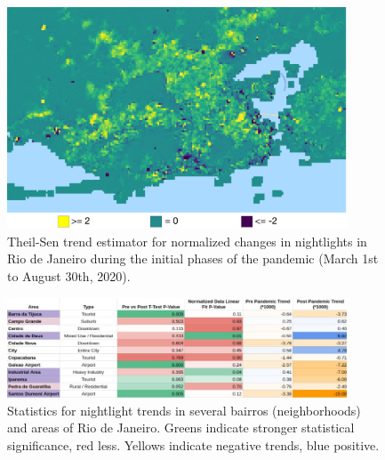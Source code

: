 \begin{figure}[!htb]
\centering
\includegraphics[width=0.9\textwidth]{Figures/chap5/Nightlights_TS.png}
\caption[Changes in nightlights in Rio de Janeiro]{Theil-Sen trend estimator for normalized changes in nightlights in Rio de Janeiro during the initial phases of the pandemic (March 1st to August 30th, 2020).}
\label{fig:nlts}
\end{figure}

\begin{figure}[!htb] 
\centering
\includegraphics[width=0.9\textwidth]{Figures/chap5/RioNightStats.jpg}
\caption[Nightlight Statistics for Rio de Janeiro]{Statistics for nightlight trends in several bairros (neighborhoods) and areas of Rio de Janeiro. Greens indicate stronger statistical significance, red less. Yellows indicate negative trends, blue positive.}
\label{fig:nstats}
\end{figure}


\clearpage

